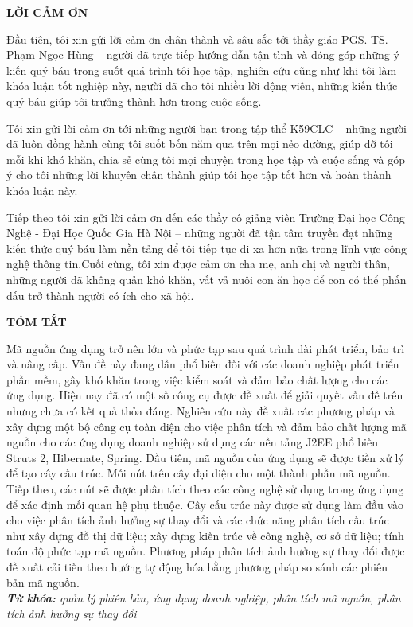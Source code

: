 \documentclass[12pt]{report}
\begin{document}
\newpage
\begin{titlepage}
\begin{center}
	\textbf{\large LỜI CẢM ƠN}
\end{center}
Đầu tiên, tôi xin gửi lời cảm ơn chân thành và sâu sắc tới thầy giáo PGS. TS. Phạm Ngọc Hùng – người đã trực tiếp hướng dẫn tận tình và đóng góp những ý kiến quý báu trong suốt quá trình tôi học tập, nghiên cứu cũng như khi tôi làm khóa luận tốt nghiệp này, người đã cho tôi nhiều lời động viên, những kiến thức quý báu giúp tôi trưởng thành hơn trong cuộc sống.

Tôi xin gửi lời cảm ơn tới những người bạn trong tập thể K59CLC – những người đã luôn đồng hành cùng tôi suốt bốn năm qua trên mọi nẻo đường, giúp đỡ tôi mỗi khi khó khăn, chia sẻ cùng tôi mọi chuyện trong học tập và cuộc sống và góp ý cho tôi những lời khuyên chân thành giúp tôi học tập tốt hơn và hoàn thành khóa luận này.

Tiếp theo tôi xin gửi lời cảm ơn đến các thầy cô giảng viên Trường Đại học Công Nghệ - Đại Học Quốc Gia Hà Nội – những người đã tận tâm truyền đạt những kiến thức quý báu làm nền tảng để tôi tiếp tục đi xa hơn nữa trong lĩnh vực công nghệ thông tin.Cuối cùng, tôi xin được cảm ơn cha mẹ, anh chị và người thân, những người đã không quản khó khăn, vất vả nuôi con ăn học để con có thể phấn đấu trở thành người có ích cho xã hội.
\end{titlepage}

	
\newpage
\begin{titlepage}
\begin{center}
	\textbf{\large TÓM TẮT}
\end{center}
Mã nguồn ứng dụng trở nên lớn và phức tạp sau quá trình dài phát triển, bảo trì và nâng cấp. Vấn đề này đang dần phổ biến đối với các doanh nghiệp phát triển phần mềm, gây khó khăn trong việc kiểm soát và đảm bảo chất lượng cho các ứng dụng. Hiện nay đã có một số công cụ được đề xuất để giải quyết vấn đề trên nhưng chưa có kết quả thỏa đáng. Nghiên cứu này đề xuất các phương pháp và xây dựng một bộ công cụ toàn diện cho việc phân tích và đảm bảo chất lượng mã nguồn cho các ứng dụng doanh nghiệp sử dụng các nền tảng J2EE phổ biến Struts 2, Hibernate, Spring. Đầu tiên, mã nguồn của ứng dụng sẽ được tiền xử lý để tạo cây cấu trúc. Mỗi nút trên cây đại diện cho một thành phần mã nguồn. Tiếp theo, các nút sẽ được phân tích theo các công nghệ sử dụng trong ứng dụng để xác định mối quan hệ phụ thuộc. Cây cấu trúc này được sử dụng làm đầu vào cho việc phân tích ảnh hưởng sự thay đổi và các chức năng phân tích cấu trúc như xây dựng đồ thị dữ liệu; xây dựng kiến trúc về công nghệ, cơ sở dữ liệu; tính toán độ phức tạp mã nguồn. Phương pháp phân tích ảnh hưởng sự thay đổi được đề xuất cải tiến theo hướng tự động hóa bằng phương pháp so sánh các phiên bản mã nguồn.\\

\noindent \textit{\textbf{Từ khóa:} quản lý phiên bản, ứng dụng doanh nghiệp, phân tích mã nguồn, phân tích ảnh hưởng sự thay đổi}
\end{titlepage}
\end{document}

